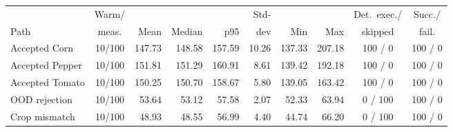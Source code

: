 \begin{center}
\scriptsize
\setlength{\tabcolsep}{3pt}
\begin{tabular}{l c r r r r r r c c}
\toprule
      & Warm/ &      &        &     & Std- &     &     & Det.\ exec./ & Succ./ \\
Path  & meas. & Mean & Median & p95 & dev  & Min & Max & skipped      & fail.  \\
\midrule
Accepted Corn       & 10/100 & 147.73 & 148.58 & 157.59 & 10.26 & 137.33 & 207.18 & 100 / 0 & 100 / 0 \\
Accepted Pepper     & 10/100 & 151.81 & 151.29 & 160.91 & 8.61  & 139.42 & 192.18 & 100 / 0 & 100 / 0 \\
Accepted Tomato     & 10/100 & 150.25 & 150.70 & 158.67 & 5.80  & 139.05 & 163.42 & 100 / 0 & 100 / 0 \\
OOD rejection       & 10/100 & 53.64  & 53.12  & 57.58  & 2.07  & 52.33  & 63.94  & 0 / 100 & 100 / 0 \\
Crop mismatch       & 10/100 & 48.93  & 48.55  & 56.99  & 4.40  & 44.74  & 66.20  & 0 / 100 & 100 / 0 \\
\bottomrule
\end{tabular}
\end{center}

